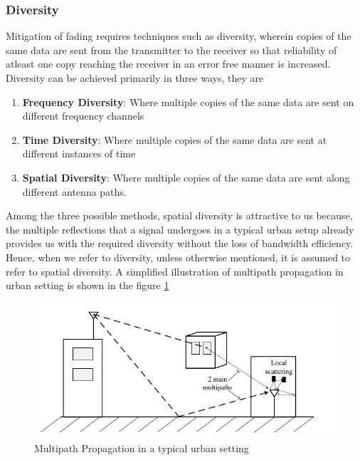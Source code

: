 \subsubsection{Diversity}
Mitigation of fading requires techniques such as diversity, wherein copies of the same data are sent from the transmitter to the receiver so that reliability of atleast one copy reaching the receiver in an error free manner is increased.\\
Diversity can be achieved primarily in three ways, they are
\begin{enumerate}
\item \textbf{Frequency Diversity}: Where multiple copies of the same data are sent on different frequency channels
\item \textbf{Time Diversity}: Where multiple copies of the same data are sent at different instances of time
\item \textbf{Spatial Diversity}: Where multiple copies of the same data are sent along different antenna paths.
\end{enumerate}
Among the three possible methods, \gls{spatial diversity} is attractive to us because, the multiple reflections that a signal undergoes in a typical urban setup already provides us with the required diversity without the loss of bandwidth efficiency. Hence, when we refer to diversity, unless otherwise mentioned, it is assumed to refer to \gls{spatial diversity}. A simplified illustration of multipath propagation in urban setting is shown in the figure \ref{fig:multipath propagation}\\
\begin{figure}[!htbp]
\centering
\includegraphics[scale=1]{Chapter 2/Figures/Multipath Propagation}
\caption{Multipath Propagation in a typical urban setting}
\label{fig:multipath propagation}
\end{figure}
